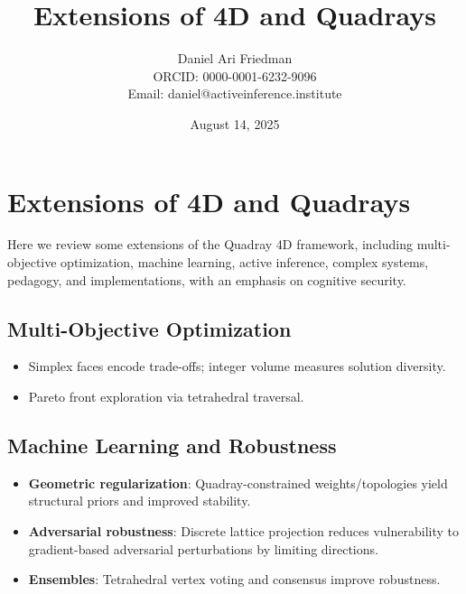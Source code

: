 \documentclass[
  10pt,
]{article}
\title{Extensions of 4D and Quadrays}
\author{Daniel Ari Friedman\\ ORCID: 0000-0001-6232-9096\\ Email: daniel@activeinference.institute}
\date{August 14, 2025}
\providecommand{\tightlist}{%
  \setlength{\itemsep}{0pt}\setlength{\parskip}{0pt}}
\begin{document}
\maketitle

{
\hypersetup{linkcolor=red}
\setcounter{tocdepth}{3}
\tableofcontents
}
\hypertarget{extensions-of-4d-and-quadrays}{%
\section{Extensions of 4D and
Quadrays}\label{extensions-of-4d-and-quadrays}}

Here we review some extensions of the Quadray 4D framework, including
multi-objective optimization, machine learning, active inference,
complex systems, pedagogy, and implementations, with an emphasis on
cognitive security.

\hypertarget{multi-objective-optimization}{%
\subsection{Multi-Objective
Optimization}\label{multi-objective-optimization}}

\begin{itemize}
\tightlist
\item
  Simplex faces encode trade-offs; integer volume measures solution
  diversity.
\item
  Pareto front exploration via tetrahedral traversal.
\end{itemize}

\hypertarget{machine-learning-and-robustness}{%
\subsection{Machine Learning and
Robustness}\label{machine-learning-and-robustness}}

\begin{itemize}
\tightlist
\item
  \textbf{Geometric regularization}: Quadray-constrained
  weights/topologies yield structural priors and improved stability.
\item
  \textbf{Adversarial robustness}: Discrete lattice projection reduces
  vulnerability to gradient-based adversarial perturbations by limiting
  directions.
\item
  \textbf{Ensembles}: Tetrahedral vertex voting and consensus improve
  robustness.
\end{itemize}
\end{document}
